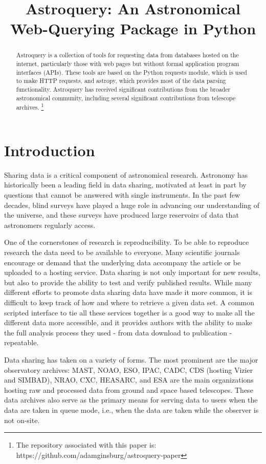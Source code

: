\documentclass[twocolumn]{aastex61}
\begin{document}


\title{Astroquery: An Astronomical Web-Querying Package in Python}

\begin{abstract}
Astroquery is a collection of tools for requesting data from databases hosted
on the internet, particularly those with web pages but without formal
application program interfaces (APIs).  These tools are based on the Python
requests module, which is used to make HTTP requests, and astropy, which
provides most of the data parsing functionality. Astroquery has received
significant contributions from the broader astronomical community, including
several significant contributions from telescope archives.
\footnote{
The repository associated with this paper is:
https://github.com/adamginsburg/astroquery-paper
}
\end{abstract}


\section{Introduction}
Sharing data is a critical component of astronomical research.  Astronomy
has historically been a leading field in data sharing, motivated at least
in part by questions that cannot be answered with single instruments.
In the past few decades, blind surveys have played a huge role in advancing our
understanding of the universe, and these surveys have produced large reservoirs
of data that astronomers regularly access.

One of the cornerstones of research is reproducibility. To be able to reproduce
research the  data need to be available to everyone. Many scientific journals
encourage or demand that the underlying data  accompany the article or be
uploaded to a hosting service. Data sharing is not only important for new
results, but also to provide the ability to test and verify published results.
While many different efforts to promote data sharing data have made it more
common, it is difficult to keep track of how and where to retrieve a given data
set. A common scripted interface to tie all these services together is a good
way to make all the different data more accessible, and it provides authors
with the ability to make the full analysis process they used - from data
download to publication - repeatable.

Data sharing has taken on a variety of forms.  The most prominent are the major
observatory archives: MAST, NOAO, ESO, IPAC, CADC, CDS (hosting Vizier and
SIMBAD), NRAO, CXC, HEASARC, and ESA are the main
organizations hosting raw and processed data from ground and space based
telescopes.  These data archives also serve as the primary means for serving data
to users when the data are taken in queue mode, i.e., when the data are taken
while the observer is not on-site.
\end{document}
